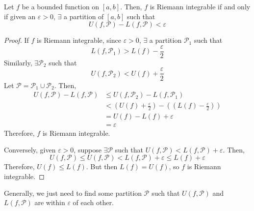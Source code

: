 \begin{theorem}{}{}
    Let $f$ be a bounded function on $[a, b]$. Then, $f$ is Riemann integrable if and only if given an $\varepsilon > 0$, $\exists$ a partition of $[a, b]$ such that $$U(f, \mathcal{P}) - L(f, \mathcal{P}) < \varepsilon$$
\end{theorem}
\begin{proof}
    If $f$ is Riemann integrable, since $\varepsilon > 0$, $\exists$ a partition $\mathcal{P}_1$ such that $$L(f, \mathcal{P}_1) > L(f) - \frac{\varepsilon}{2}$$
    Similarly, $\exists \mathcal{P}_2$ such that $$U(f, \mathcal{P}_2) < U(f) + \frac{\varepsilon}{2}$$
    Let $\mathcal{P} = \mathcal{P}_1 \cup \mathcal{P}_2$. Then,
    \begin{align*}
        U(f, \mathcal{P}) - L(f, \mathcal{P}) &\leq U(f, \mathcal{P}_2) - L(f, \mathcal{P}_1) \\
        &< \left(U(f) + \frac{\varepsilon}{2}\right) - \left((L(f) - \frac{\varepsilon}{2})\right) \\
        &= U(f) - L(f) + \varepsilon \\
        &= \varepsilon
    \end{align*}
    Therefore, $f$ is Riemann integrable.

    Conversely, given $\varepsilon > 0$, suppose $\exists \mathcal{P}$ such that $U(f, \mathcal{P}) < L(f, \mathcal{P}) + \varepsilon$. Then, $$U(f, \mathcal{P}) \leq U(f, \mathcal{P}) < L(f, \mathcal{P}) + \varepsilon \leq L(f) + \varepsilon$$
    Therefore, $U(f) \leq L(f)$. But then $L(f) = U(f)$, so $f$ is Riemann integrable.
\end{proof}
\begin{note}
    Generally, we just need to find some partition $\mathcal{P}$ such that $U(f, \mathcal{P})$ and $L(f, \mathcal{P})$ are within $\varepsilon$ of each other.
\end{note}

